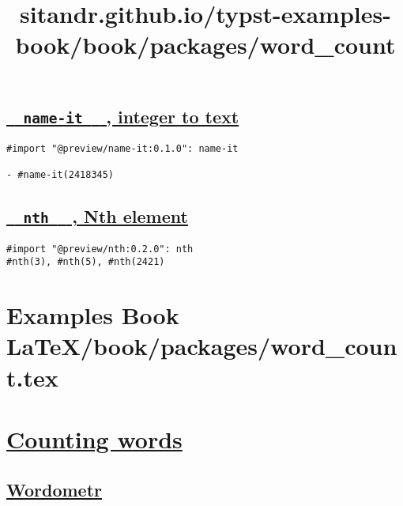 \pandocbounded{}

\subsection{\texorpdfstring{\hyperref[name-it-integer-to-text]{\texttt{\ }{\texttt{\ name-it\ }}\texttt{\ }
, integer to
text}}{  name-it   , integer to text}}\label{name-it-integer-to-text}

\begin{verbatim}
#import "@preview/name-it:0.1.0": name-it

- #name-it(2418345)
\end{verbatim}

\pandocbounded{}

\subsection{\texorpdfstring{\hyperref[nth-nth-element]{\texttt{\ }{\texttt{\ nth\ }}\texttt{\ }
, Nth element}}{  nth   , Nth element}}\label{nth-nth-element}

\begin{verbatim}
#import "@preview/nth:0.2.0": nth
#nth(3), #nth(5), #nth(2421)
\end{verbatim}

\pandocbounded{}


\section{Examples Book LaTeX/book/packages/word_count.tex}
\title{sitandr.github.io/typst-examples-book/book/packages/word_count}

\section{\texorpdfstring{\hyperref[counting-words]{Counting
words}}{Counting words}}\label{counting-words}

\subsection{\texorpdfstring{\hyperref[wordometr]{Wordometr}}{Wordometr}}\label{wordometr}


